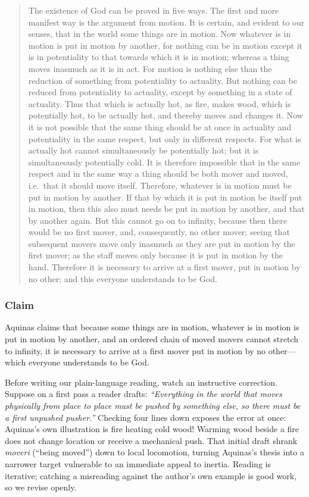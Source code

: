\begin{quote}
The existence of God can be proved in five ways. The first and more manifest way is the argument from motion. It is certain, and evident to our senses, that in the world some things are in motion. Now whatever is in motion is put in motion by another, for nothing can be in motion except it is in potentiality to that towards which it is in motion; whereas a thing moves inasmuch as it is in act. For motion is nothing else than the reduction of something from potentiality to actuality. But nothing can be reduced from potentiality to actuality, except by something in a state of actuality. Thus that which is actually hot, as fire, makes wood, which is potentially hot, to be actually hot, and thereby moves and changes it. Now it is not possible that the same thing should be at once in actuality and potentiality in the same respect, but only in different respects. For what is actually hot cannot simultaneously be potentially hot; but it is simultaneously potentially cold. It is therefore impossible that in the same respect and in the same way a thing should be both mover and moved, i.e.\ that it should move itself. Therefore, whatever is in motion must be put in motion by another. If that by which it is put in motion be itself put in motion, then this also must needs be put in motion by another, and that by another again. But this cannot go on to infinity, because then there would be no first mover, and, consequently, no other mover; seeing that subsequent movers move only inasmuch as they are put in motion by the first mover; as the staff moves only because it is put in motion by the hand. Therefore it is necessary to arrive at a first mover, put in motion by no other; and this everyone understands to be God.
\end{quote}

\subsubsection*{Claim}
Aquinas claims that because some things are in motion, whatever is in motion is put in motion by another, and an ordered chain of moved movers cannot stretch to infinity, it is necessary to arrive at a first mover put in motion by no other---which everyone understands to be God.

Before writing our plain-language reading, watch an instructive correction. Suppose on a first pass a reader drafts: \emph{``Everything in the world that moves physically from place to place must be pushed by something else, so there must be a first unpushed pusher.''} Checking four lines down exposes the error at once: Aquinas's own illustration is fire heating cold wood! Warming wood beside a fire does not change location or receive a mechanical push. That initial draft shrank \emph{moveri} (``being moved'') down to local locomotion, turning Aquinas's thesis into a narrower target vulnerable to an immediate appeal to inertia. Reading is iterative; catching a misreading against the author's own example is good work, so we revise openly.


